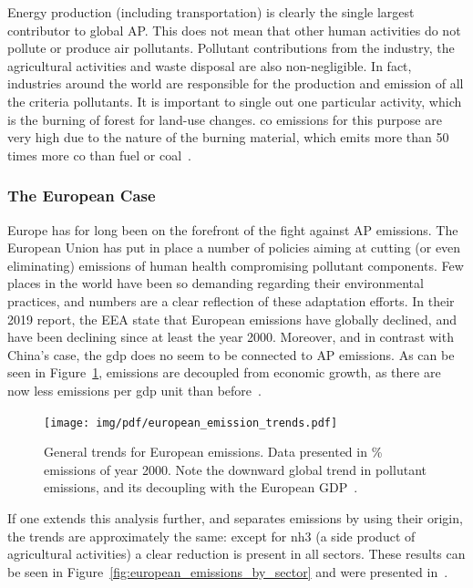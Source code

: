 Energy production (including transportation) is clearly the single
largest contributor to global \gls{AP}. This does not mean that other
human activities do not pollute or produce air pollutants. Pollutant
contributions from the industry, the agricultural activities and waste
disposal are also non-negligible. In fact, industries around the world
are responsible for the production and emission of all the criteria
pollutants. It is important to single out one particular activity, which
is the burning of forest for land-use changes. \gls{co} emissions for
this purpose are very high due to the nature of the burning material,
which emits more than 50 times more \gls{co} than fuel or
coal~\cite{CABI2019}.

\subsubsection{The European Case}%
\label{ssub:the_european_case}

Europe has for long been on the forefront of the fight against \gls{AP}
emissions. The European Union has put in place a number of policies
aiming at cutting (or even eliminating) emissions of human health
compromising pollutant components. Few places in the world have been so
demanding regarding their environmental practices, and numbers are a
clear reflection of these adaptation efforts. In their 2019 report, the
\gls{EEA} state that European emissions have globally declined, and have
been declining since at least the year 2000. Moreover, and in contrast
with China's case, the \gls{gdp} does no seem to be connected to
\gls{AP} emissions. As can be seen in
Figure~\ref{fig:european_emission_trends}, emissions are decoupled from
economic growth, as there are now less emissions per \gls{gdp} unit than
before~\cite{EEA2019}.

\begin{figure}[htpb]
    \centering
    \texttt{[image: img/pdf/european\_emission\_trends.pdf]}
    \caption{General trends for European emissions. Data presented in \%
    emissions of year 2000. Note the downward global trend in pollutant
    emissions, and its decoupling with the European GDP~\cite{EEA2019}.}
    \label{fig:european_emission_trends}
\end{figure}

If one extends this analysis further, and separates emissions by using
their origin, the trends are approximately the same: except for
\gls{nh3} (a side product of agricultural activities) a clear reduction
is present in all sectors. These results can be seen in
Figure~\ref{fig:european_emissions_by_sector} and were presented
in~\cite{EEA2019}.


